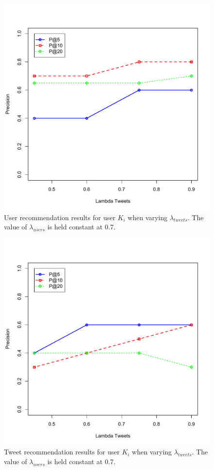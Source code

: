 \begin{figure}
  \centering
  \includegraphics[scale=0.75]{Ki_Varying_LambdaTweets_UserResults}
  \caption[User recommendation results for user $K_{i}$ when varying $\lambda_{tweets}$]{User recommendation results for user $K_{i}$ when varying $\lambda_{tweets}$. The value of $\lambda_{users}$ is held constant at 0.7.}
  \label{fig:UsersForVaryingLambdaTweets}
\end{figure}
\begin{figure}
  \centering
  \includegraphics[scale=0.75]{Ki_Varying_LambdaTweets_TweetResults}
  \caption[Tweet recommendation results for user $K_{i}$ when varying $\lambda_{tweets}$]{Tweet recommendation results for user $K_{i}$ when varying $\lambda_{tweets}$. The value of $\lambda_{users}$ is held constant at 0.7.}
  \label{fig:TweetsForVaryingLambdaTweets}
\end{figure}



